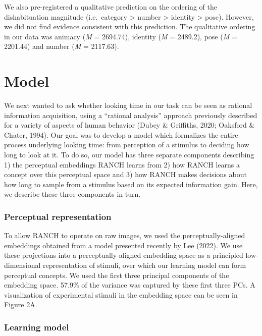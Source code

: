 \documentclass[10pt, letterpaper]{article}
\begin{document}
We also pre-registered a qualitative prediction on the ordering of the
dishabituation magnitude (i.e.~category \textgreater{} number
\textgreater{} identity \textgreater{} pose). However, we did not find
evidence consistent with this prediction. The qualitative ordering in
our data was animacy (\emph{M} = 2694.74), identity (\emph{M} = 2489.2),
pose (\emph{M} = 2201.44) and number (\emph{M} = 2117.63).

\hypertarget{model}{%
\section{Model}\label{model}}

We next wanted to ask whether looking time in our task can be seen as
rational information acquisition, using a ``rational analysis'' approach
previously described for a variety of aspects of human behavior (Dubey
\& Griffiths, 2020; Oaksford \& Chater, 1994). Our goal was to develop a
model which formalizes the entire process underlying looking time: from
perception of a stimulus to deciding how long to look at it. To do so,
our model has three separate components describing 1) the perceptual
embeddings RANCH learns from 2) how RANCH learns a concept over this
perceptual space and 3) how RANCH makes decisions about how long to
sample from a stimulus based on its expected information gain. Here, we
describe these three components in turn.

\hypertarget{perceptual-representation}{%
\subsubsection{Perceptual
representation}\label{perceptual-representation}}

To allow RANCH to operate on raw images, we used the
perceptually-aligned embeddings obtained from a model presented recently
by Lee (2022). We use these projections into a perceptually-aligned
embedding space as a principled low-dimensional representation of
stimuli, over which our learning model can form perceptual concepts. We
used the first three principal components of the embedding space. 57.9\%
of the variance was captured by these first three PCs. A visualization
of experimental stimuli in the embedding space can be seen in Figure 2A.

\hypertarget{learning-model}{%
\subsubsection{Learning model}\label{learning-model}}
\end{document}

